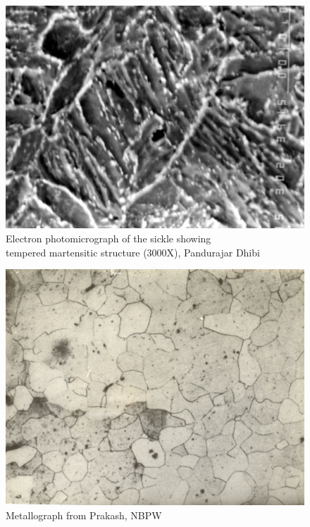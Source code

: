 \begin{figure}[H]
\renewcommand{\thefigure}{22B}
\includegraphics[scale=0.68]{images/chapter-4/fig022B.jpg}
\caption{Electron photomicrograph of the sickle showing\\ tempered martensitic structure (3000X), Pandurajar Dhibi}\label{chapter-4-fig22B}
\end{figure}

\begin{figure}[H]
\renewcommand{\thefigure}{23A}
\includegraphics[scale=0.78]{images/chapter-4/fig023A.jpg}
\caption{Metallograph from Prakash, NBPW}\label{chapter-4-fig23A}
\end{figure}

